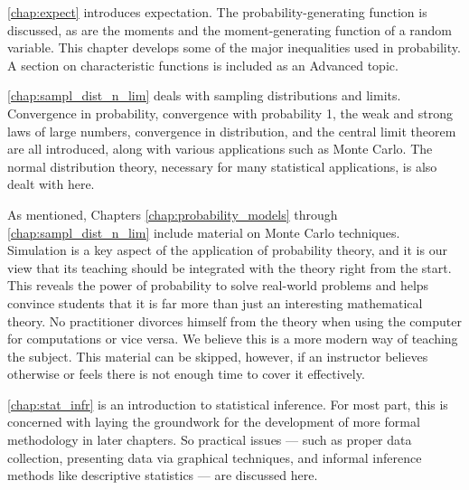 \autoref{chap:expect} introduces expectation. The probability-generating function is discussed, as are the moments and the moment-generating function of a random variable. This chapter develops some of the major inequalities used in probability. A section on characteristic functions is included as an Advanced topic.

\autoref{chap:sampl_dist_n_lim} deals with sampling distributions and limits. Convergence in probability, convergence with probability 1, the weak and strong laws of large numbers, convergence in distribution, and the central limit theorem are all introduced, along with various applications such as Monte Carlo. The normal distribution theory, necessary  for  many statistical applications, is also dealt with here.

As mentioned, Chapters \ref{chap:probability_models} through \ref{chap:sampl_dist_n_lim} include material on Monte Carlo techniques. Simulation is a key aspect of the application of probability theory, and it is our view that its teaching should be integrated with the theory right from the start. This reveals the power of probability to solve real-world problems and helps convince students that it is far more than just an interesting mathematical theory. No practitioner divorces himself from the theory when using the computer for computations or vice versa. We believe this is a more modern way of teaching the subject. This material can be skipped, however, if an instructor believes otherwise or feels there is not enough time to cover it effectively.

\autoref{chap:stat_infr} is an introduction to statistical inference. For most part, this is concerned with laying the groundwork for the development of more formal methodology in later chapters. So practical issues --- such as proper data collection, presenting data via graphical techniques, and informal inference methods like descriptive statistics --- are discussed here.